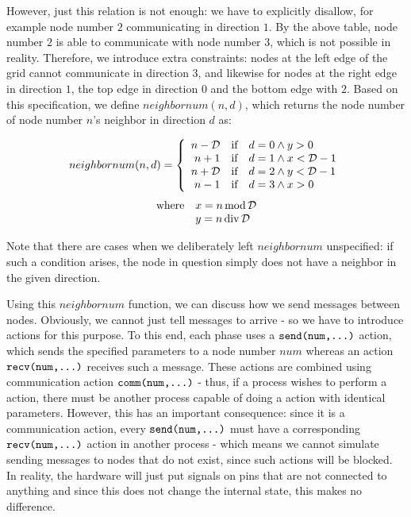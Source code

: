 However, just this relation is not enough: we have to explicitly disallow, for example node number $2$ communicating in direction $1$. By the above table, node number $2$ is able to communicate with node number $3$, which is not possible in reality. Therefore, we introduce extra constraints: nodes at the left edge of the grid cannot communicate in direction $3$, and likewise for nodes at the right edge in direction $1$, the top edge in direction $0$ and the bottom edge with $2$. Based on this specification, we define $neighbornum(n,d)$, which returns the node number of node number $n$'s neighbor in direction $d$ as:

\begin{displaymath}
neighbornum(n,d) = \left\{\begin{array}{rcl}
n - \mathcal{D} & \mbox{if} & d = 0 \land y > 0\\
n + 1   & \mbox{if} & d = 1 \land x < \mathcal{D} - 1\\
n + \mathcal{D} & \mbox{if} & d = 2 \land y < \mathcal{D} - 1\\
n - 1   & \mbox{if} & d = 3 \land x > 0\\
\end{array}\right.
\end{displaymath}
\begin{displaymath}
\begin{array}{rl}
\mbox{where} & x = n \operatorname{mod} \mathcal{D} \\
             & y = n \operatorname{div} \mathcal{D} \\
\end{array}
\end{displaymath}

Note that there are cases when we deliberately left $neighbornum$ unspecified: if such a condition arises, the node in question simply does not have a neighbor in the given direction.

Using this $neighbornum$ function, we can discuss how we send messages between nodes. Obviously, we cannot just tell messages to arrive - so we have to introduce actions for this purpose. To this end, each phase uses a $\texttt{send(num,\dots)}$ action, which sends the specified parameters to a node number $num$ whereas an action $\texttt{recv(num,\dots)}$ receives such a message. These actions are combined using communication action $\texttt{comm(num,\dots)}$ - thus, if a process wishes to perform a  action, there must be another process capable of doing a  action with identical parameters. However, this has an important consequence: since it is a communication action, every $\texttt{send(num,\dots)}$ must have a corresponding $\texttt{recv(num,\dots)}$ action in another process - which means we cannot simulate sending messages to nodes that do not exist, since such actions will be blocked. In reality, the hardware will just put signals on pins that are not connected to anything and since this does not change the internal state, this makes no difference.

